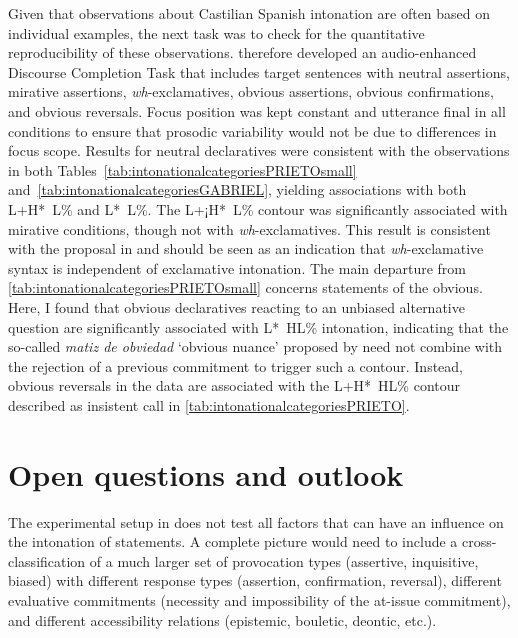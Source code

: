 Given that observations about Castilian Spanish intonation are often based on individual examples, the next task was to check for the quantitative reproducibility of these observations.   therefore developed an audio-enhanced Discourse Completion Task that includes target sentences with neutral assertions, mirative assertions, \textit{wh}-exclamatives, obvious assertions, obvious con\-fir\-ma\-tions, and obvious reversals. Focus position was kept constant and utterance final in all conditions to ensure that prosodic variability would not be due to differences in focus scope. Results for neutral declaratives were consistent with the observations in both Tables~\ref{tab:intonationalcategoriesPRIETOsmall} and~\ref{tab:intonationalcategoriesGABRIEL}, yielding associations with both L+H*~L\% and L*~L\%. The L+¡H*~L\% contour was significantly associated with mirative conditions, though not with \textit{wh}-exclamatives. This result is consistent with the proposal in  and should be seen as an indication that \textit{wh}-exclamative syntax is independent of exclamative intonation. The main departure from \autoref{tab:intonationalcategoriesPRIETOsmall} concerns statements of the obvious. Here, I found that obvious declaratives reacting to an unbiased alternative question are significantly associated with L*~HL\% intonation, indicating that the so-called \textit{matiz de obviedad} `obvious nuance' proposed by \citet[277--279]{EstebasVilaplanaPrieto.2008} need not combine with the rejection of a previous commitment to trigger such a contour. Instead, obvious reversals in the data are associated with the L+H*~HL\% contour described as insistent call in \autoref{tab:intonationalcategoriesPRIETO}. 

\section{Open questions and outlook}\label{ch:7.2}

The experimental setup in  does not test all factors that can have an influence on the intonation of statements. A complete picture would need to include a cross-classification of a much larger set of provocation types (assertive, inquisitive, biased) with different response types (assertion, confirmation, reversal), different evaluative commitments (necessity and impossibility of the at-issue commitment), and different accessibility relations (epistemic, bouletic, deontic, etc.). 

